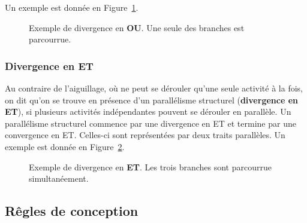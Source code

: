  Un exemple est donnée en Figure~\ref{fig:divOU}.


\begin{figure}[ht]
  \centering
  
  \caption{Exemple de divergence en \textbf{OU}. Une seule des branches est parcourrue.}
  \label{fig:divOU}
\end{figure}


\subsubsection{Divergence en ET}
Au contraire de l'aiguillage, où ne peut se dérouler qu'une seule activité à la fois, on dit qu'on se trouve en présence d'un parallélisme structurel (\textbf{divergence en ET}), si plusieurs activités indépendantes pouvent se dérouler en parallèle. Un parallélisme structurel commence par une divergence en ET et termine par une convergence en ET. Celles-ci sont représentées par deux traits parallèles. Un exemple est donnée en Figure~\ref{fig:divET}.

\begin{figure}
  \centering
  
  \caption{Exemple de divergence en \textbf{ET}. Les trois branches sont parcourrue simultanéement.}
  \label{fig:divET}
\end{figure}

\subsection{Rêgles de conception}

